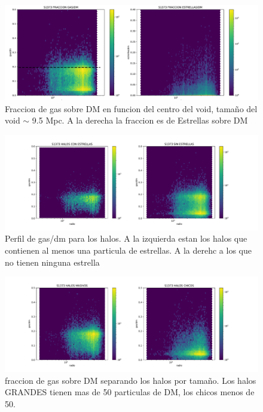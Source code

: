 \begin{figure}[h]
\centering
\includegraphics[width=18cm]{Figures/S1373_scatterFRACCIONES.pdf}
\decoRule
\caption[S1373 GAS/DM perfil (scatter)]{Fraccion de gas sobre DM en funcion del centro del void, tamaño del void $\sim$ 9.5 Mpc. A la derecha la fraccion es de Estrellas sobre DM}
\label{fig:Electron}
\end{figure}

\begin{figure}[h]
\centering
\includegraphics[width=18cm]{Figures/S1373_scatterFRACCIONES_con&sinEST.pdf}
\decoRule
\caption[R1198 GAS/DM perfil (scatter) con y sin estrellas]{Perfil de gas/dm para los halos. A  la izquierda estan los halos que contienen al menos una particula de estrellas. A la derehc a los que no tienen ninguna estrella}
\label{fig:Electron}
\end{figure}

\begin{figure}[h]
\centering
\includegraphics[width=18cm]{Figures/S1373_scatterFRACCIONES_grandesYchicos.pdf}
\decoRule
\caption[R1198 GAS/DM perfil (scatter) halos grandes y chicos]{fraccion de gas sobre DM separando los halos por tamaño. Los halos GRANDES tienen mas de 50 particulas de DM, los chicos menos de 50. }
\label{fig:Electron}
\end{figure}

